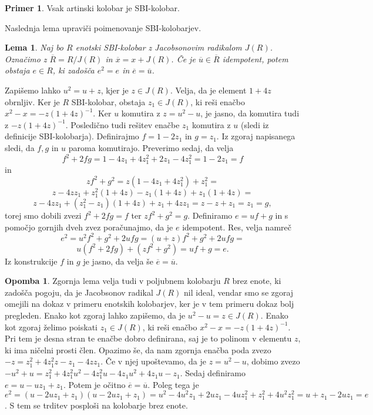 \documentclass[a4paper, 12pt]{amsart}
\theoremstyle{definition} %
\newtheorem{primer}[definicija]{Primer}
\newtheorem{opomba}[definicija]{Opomba}
\theoremstyle{plain} %
\newtheorem{lema}[definicija]{Lema}
\begin{document}
\begin{primer}
Vsak artinski kolobar je SBI-kolobar.
\end{primer}

Naslednja lema upraviči poimenovanje SBI-kolobarjev.

\begin{lema}
\label{SBIEnIdem}
Naj bo $R$ enotski SBI-kolobar z Jacobsonovim radikalom $J(R)$. Označimo z $\overline{R} = R/J(R)$ in $\overline{x} = x + J(R)$. Če je $\overline{u} \in \overline{R}$ idempotent, potem obstaja $e\in R$, ki zadošča $e^2 = e$ in $\overline{e} = \overline{u}$.
\end{lema}

\proof
Zapišemo lahko $u^2 = u+z$, kjer je $z\in J(R)$. Velja, da je element $1+4z$ obrnljiv. Ker je $R$ SBI-kolobar, obstaja $z_1\in  J(R)$, ki reši enačbo $x^2 - x = -z(1+4z)^{-1}$. Ker $u$ komutira z $z=u^2 - u$, je jasno, da komutira tudi z $-z(1+4z)^{-1}$. Posledično tudi rešitev enačbe $z_1$ komutira z $u$ (sledi iz definicije SBI-kolobarja). Definirajmo $f=1-2z_1$ in $g=z_1$. Iz zgoraj napisanega sledi, da $f,g$ in $u$ paroma komutirajo. Preverimo sedaj, da velja
$$
f^2 +2fg = 1-4z_1 + 4 z_1^2 + 2z_1 - 4z_1^2 = 1 - 2z_1 = f
$$  
in
$$
zf^2 + g^2 = z(1-4z_1 + 4z_1^2) + z_1^2 =
$$
$$
z- 4zz_1 + z_1^2(1+4z) - z_1(1+4z) + z_1(1+4z) =
$$
$$
z - 4zz_1 + (z_1^2 - z_1)(1+4z) + z_1 +4zz_1 = z-z+z_1=z_1=g,
$$
torej smo dobili zvezi $f^2 + 2fg = f$ ter $zf^2 + g^2 = g$. Definiramo $e = uf +g$ in s pomočjo gornjih dveh zvez poračunajmo, da je $e$ idempotent. Res, velja namreč
$$
e^2 = u^2 f^2 + g^2 + 2ufg = (u+z)f^2 + g^2 + 2ufg = 
$$
$$
u(f^2 +2fg) + (zf^2 +g^2) = uf +g = e.
$$
Iz konstrukcije $f$ in $g$ je jasno, da velja še $\overline{e} = \overline{u}$.
\endproof

\begin{opomba}
Zgornja lema velja tudi v poljubnem kolobarju $R$ brez enote, ki zadošča pogoju, da je Jacobsonov radikal $J(R)$ nil ideal, vendar smo se zgoraj omejili na dokaz v primeru enotskih kolobarjev, ker je v tem primeru dokaz bolj pregleden. Enako kot zgoraj lahko zapišemo, da je $u^2 - u = z\in J(R)$. Enako kot zgoraj želimo poiskati $z_1\in J(R)$, ki reši enačbo $x^2 - x = -z(1+4z)^{-1}$. Pri tem je desna stran te enačbe dobro definirana, saj je to polinom v elementu $z$, ki ima ničelni prosti člen. Opazimo še, da nam zgornja enačba poda zvezo $-z=z_1^2 +4z_1^2z - z_1 - 4zz_1$. Če v njej upoštevamo, da je $z = u^2 - u$, dobimo zvezo $-u^2 +u = z_1^2 + 4z_1^2 u^2 - 4z_1^2 u-4z_1u^2 +4z_1u - z_1$. Sedaj definiramo $e=u-uz_1 + z_1$. Potem je očitno $\overline{e} = \overline{u}$. Poleg tega je $e^2 = (u-2uz_1+z_1)(u-2uz_1 + z_1) = u^2 - 4u^2 z_1 +2uz_1 - 4uz_1^2 + z_1^2 + 4u^2z_1^2 = u+z_1 - 2uz_1=e$. S tem se trditev posploši na kolobarje brez enote.
\end{opomba}
\end{document}
